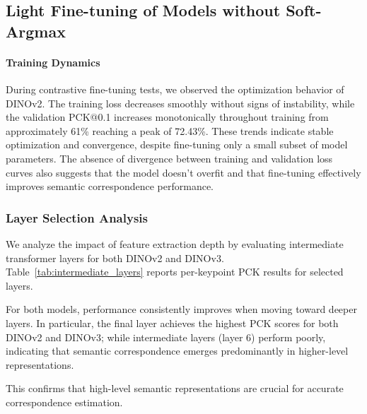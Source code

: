 
\subsection{Light Fine-tuning of Models without Soft-Argmax}


\paragraph{Training Dynamics}

During contrastive fine-tuning tests, we observed the optimization behavior of DINOv2.
The training loss decreases smoothly without signs of instability, while the validation PCK@0.1 increases
monotonically throughout training from approximately 61\% reaching a peak of 72.43\%.
These trends indicate stable optimization and convergence, despite fine-tuning only a small subset of model parameters.
The absence of divergence between training and validation loss curves also suggests that the model doesn't overfit
and that fine-tuning effectively improves semantic correspondence performance.


\subsubsection{Layer Selection Analysis}

We analyze the impact of feature extraction depth by evaluating intermediate transformer layers for both DINOv2 and DINOv3.
Table~\ref{tab:intermediate_layers} reports per-keypoint PCK results for selected layers.

For both models, performance consistently improves when moving toward deeper layers.
In particular, the final layer achieves the highest PCK scores for both DINOv2 and DINOv3; while intermediate layers (\eg layer 6) perform poorly,
indicating that semantic correspondence emerges predominantly in higher-level representations.

This confirms that high-level semantic representations are crucial for accurate correspondence estimation.


